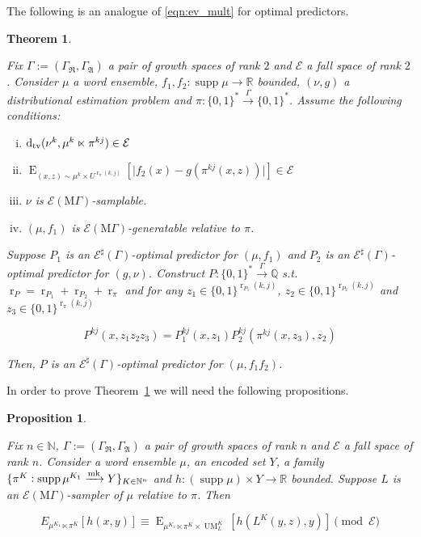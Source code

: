 \documentclass{article}
\numberwithin{equation}{section}
\theoremstyle{definition}
\theoremstyle{plain}
\newtheorem{theorem}{Theorem}[section]
\newtheorem{proposition}{Proposition}[section]
\newcommand{\Words}{{\{ 0, 1 \}^*}}
\newcommand{\WordsLen}[1]{{\{ 0, 1 \}^{#1}}}
\DeclareMathOperator{\Supp}{supp}
\DeclareMathOperator{\E}{E}
\DeclareMathOperator{\R}{r}
\DeclareMathOperator{\UM}{UM}
\newcommand{\Dtv}{\operatorname{d}_{\textnormal{tv}}}
\newcommand{\Nats}{\mathbb{N}}
\newcommand{\Rats}{\mathbb{Q}}
\newcommand{\Reals}{\mathbb{R}}
\newcommand{\Abs}[1]{\lvert #1 \rvert}
\newcommand{\GrowR}{\Gamma_{\mathfrak{R}}}
\newcommand{\GrowA}{\Gamma_{\mathfrak{A}}}
\newcommand{\Grow}{\Gamma:=(\GrowR,\GrowA)}
\newcommand{\MGrow}{\mathrm{M}\Gamma}
\newcommand{\Fall}{\mathcal{E}}
\newcommand{\Markov}{\xrightarrow{\textnormal{mk}}}
\newcommand{\Scheme}{\xrightarrow{\Gamma}}
\begin{document}
The following is an analogue of \ref{eqn:ev_mult} for optimal predictors.

\begin{samepage}
\begin{theorem}
\label{thm:mult}

Fix $\Grow$ a pair of growth spaces of rank $2$ and $\Fall$ a fall space of rank $2$. Consider $\mu$ a word ensemble, $f_1, f_2: \Supp \mu \rightarrow \Reals$ bounded, $(\nu,g)$ a distributional estimation problem and $\pi: \Words \Scheme \Words$. Assume the following conditions:

\begin{enumerate}[(i)]

\item $\Dtv(\nu^k,\mu^k \ltimes \pi^{kj}) \in \Fall$

\item $\E_{(x,z) \sim \mu^k \times U^{\R_\pi(k,j)}}[\Abs{f_2(x)-g(\pi^{kj}(x,z))}] \in \Fall$

\item $\nu$ is $\Fall(\MGrow)$-samplable.

\item $(\mu, f_1)$ is $\Fall(\MGrow)$-generatable relative to $\pi$.

\end{enumerate}

Suppose $P_1$ is an $\Fall^\sharp(\Gamma)$-optimal predictor for $(\mu,f_1)$ and $P_2$ is an $\Fall^\sharp(\Gamma)$-optimal predictor for $(g,\nu)$. Construct $P: \Words \Scheme \Rats$ s.t. $\R_P=\R_{P_1}+\R_{P_2}+\R_{\pi}$ and for any $z_1 \in \WordsLen{\R_{P_1}(k,j)}$, $z_2 \in \WordsLen{\R_{P_2}(k,j)}$ and $z_3 \in \WordsLen{\R_\pi(k,j)}$

\begin{equation}
P^{kj}(x,z_1 z_2 z_3)=P_1^{kj}(x,z_1) P_2^{kj}(\pi^{kj}(x,z_3),z_2)
\end{equation}

Then, $P$ is an $\Fall^\sharp(\Gamma)$-optimal predictor for $(\mu,f_1 f_2)$.

\end{theorem}
\end{samepage}

In order to prove Theorem~\ref{thm:mult} we will need the following propositions.

\begin{samepage}
\begin{proposition}
\label{prp:smp}

Fix $n \in \Nats$, $\Grow$ a pair of growth spaces of rank $n$ and $\Fall$ a fall space of rank $n$. Consider a word ensemble $\mu$, an encoded set $Y$, a family $\{\pi^K: \Supp \mu^{K_1} \Markov Y\}_{K \in \Nats^n}$ and ${h: (\Supp \mu) \times Y \rightarrow \Reals}$ bounded. Suppose $L$ is an $\Fall(\MGrow)$-sampler of $\mu$ relative to $\pi$. Then

\begin{equation}
E_{\mu^{K_1} \ltimes \pi^K}[h(x,y)] \equiv \E_{\mu^{K_1} \ltimes \pi^K \times \UM_L^K}[h(L^K(y,z),y)] \pmod \Fall
\end{equation}

\end{proposition}
\end{samepage}
\end{document}
